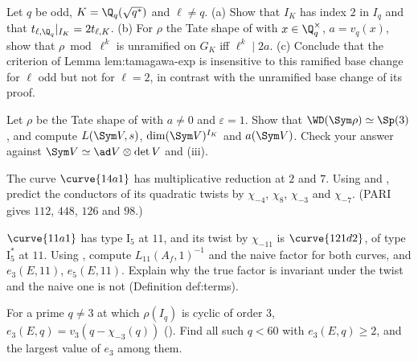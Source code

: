 \begin{exercise}\label{ex:local:ex-ramified-basechange}
Let $q$ be odd, $K=\Q_q(\sqrt{q^*})$ and $\ell\ne q$. (a) Show that $I_K$ has index $2$ in $I_q$ and that $t_{\ell,\Q_q}|_{I_K}=2t_{\ell,K}$. (b) For $\rho$ the Tate shape of
 with $x\in\Q_q^\times$, $a=v_q(x)$, show that $\rho\bmod\ell^k$ is unramified on $G_K$ iff $\ell^k\mid2a$. (c) Conclude that the criterion of
Lemma lem:tamagawa-exp is insensitive to this ramified base change for $\ell$ odd but not for $\ell=2$, in contrast with the unramified base change of its proof.
\end{exercise}

\begin{exercise}\label{ex:local:ex-sym2}
Let $\rho$ be the Tate shape of  with $a\ne0$ and $\varepsilon=1$. Show that $\WD(\Sym\rho)\simeq\Sp(3)$, and compute $L(\Sym V,s)$, $\dim(\Sym V)^{I_K}$
and $a(\Sym V)$. Check your answer against $\Sym V\simeq\ad V\otimes\det V$ and (iii).
\end{exercise}

\begin{exercise}\label{ex:local:ex-twist-conductor}
The curve $\curve{14a1}$ has multiplicative reduction at $2$ and $7$. Using  and , predict the
conductors of its quadratic twists by $\chi_{-4}$, $\chi_8$, $\chi_{-3}$ and $\chi_{-7}$. (PARI gives $112$, $448$, $126$ and $98$.)
\end{exercise}

\begin{exercise}\label{ex:local:ex-121d2}
$\curve{11a1}$ has type $\mathrm{I}_5$ at $11$, and its twist by $\chi_{-11}$ is $\curve{121d2}$, of type $\mathrm{I}_5^*$ at $11$. Using
, compute $L_{11}(A_f,1)^{-1}$ and the naive factor for both curves, and $e_3(E,11)$, $e_5(E,11)$. Explain why the true factor is
invariant under the twist and the naive one is not (Definition def:terms).
\end{exercise}

\begin{exercise}\label{ex:local:ex-e3}
For a prime $q\ne3$ at which $\rho(I_q)$ is cyclic of order $3$, $e_3(E,q)=v_3(q-\chi_{-3}(q))$ (). Find all such $q<60$ with
$e_3(E,q)\ge2$, and the largest value of $e_3$ among them.
\end{exercise}

